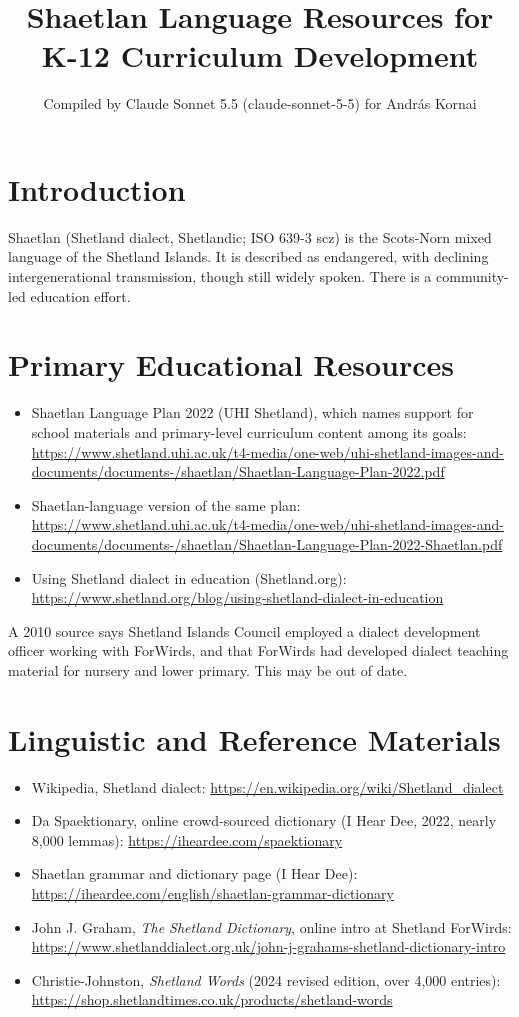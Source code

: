 \documentclass[12pt]{article}
\title{Shaetlan Language Resources for K-12 Curriculum Development}
\author{Compiled by Claude Sonnet 5.5 (claude-sonnet-5-5) for Andr\'as Kornai}
\date{}
\begin{document}
\maketitle

\section{Introduction}
Shaetlan (Shetland dialect, Shetlandic; ISO 639-3 scz) is the Scots-Norn mixed language of the Shetland Islands. It is described as endangered, with declining intergenerational transmission, though still widely spoken. There is a community-led education effort.

\section{Primary Educational Resources}
\begin{itemize}
\item Shaetlan Language Plan 2022 (UHI Shetland), which names support for school materials and primary-level curriculum content among its goals: \url{https://www.shetland.uhi.ac.uk/t4-media/one-web/uhi-shetland-images-and-documents/documents-/shaetlan/Shaetlan-Language-Plan-2022.pdf}
\item Shaetlan-language version of the same plan: \url{https://www.shetland.uhi.ac.uk/t4-media/one-web/uhi-shetland-images-and-documents/documents-/shaetlan/Shaetlan-Language-Plan-2022-Shaetlan.pdf}
\item Using Shetland dialect in education (Shetland.org): \url{https://www.shetland.org/blog/using-shetland-dialect-in-education}
\end{itemize}
A 2010 source says Shetland Islands Council employed a dialect development officer working with ForWirds, and that ForWirds had developed dialect teaching material for nursery and lower primary. This may be out of date.

\section{Linguistic and Reference Materials}
\begin{itemize}
\item Wikipedia, Shetland dialect: \url{https://en.wikipedia.org/wiki/Shetland_dialect}
\item Da Spaektionary, online crowd-sourced dictionary (I Hear Dee, 2022, nearly 8,000 lemmas): \url{https://iheardee.com/spaektionary}
\item Shaetlan grammar and dictionary page (I Hear Dee): \url{https://iheardee.com/english/shaetlan-grammar-dictionary}
\item John J. Graham, \emph{The Shetland Dictionary}, online intro at Shetland ForWirds: \url{https://www.shetlanddialect.org.uk/john-j-grahams-shetland-dictionary-intro}
\item Christie-Johnston, \emph{Shetland Words} (2024 revised edition, over 4,000 entries): \url{https://shop.shetlandtimes.co.uk/products/shetland-words}
\end{itemize}
\end{document}
